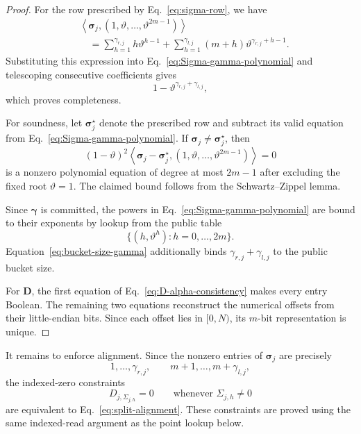 \begin{proof}
For the row prescribed by Eq.~\eqref{eq:sigma-row}, we have
\[
\begin{aligned}
&
\left\langle
\bm\sigma_j,
(1,\vartheta,\ldots,\vartheta^{2m-1})
\right\rangle\\
&\quad=
\sum_{h=1}^{\gamma_{r,j}}
    h\vartheta^{h-1}
+
\sum_{h=1}^{\gamma_{l,j}}
    (m+h)\vartheta^{\gamma_{r,j}+h-1}.
\end{aligned}
\]
Substituting this expression into
Eq.~\eqref{eq:Sigma-gamma-polynomial} and telescoping consecutive
coefficients gives
\[
    1-\vartheta^{\gamma_{r,j}+\gamma_{l,j}},
\]
which proves completeness.

For soundness, let $\bm\sigma_j^\star$ denote the prescribed row and
subtract its valid equation from
Eq.~\eqref{eq:Sigma-gamma-polynomial}.  If
$\bm\sigma_j\neq\bm\sigma_j^\star$, then
\[
(1-\vartheta)^2
\left\langle
\bm\sigma_j-\bm\sigma_j^\star,
(1,\vartheta,\ldots,\vartheta^{2m-1})
\right\rangle
=0
\]
is a nonzero polynomial equation of degree at most $2m-1$ after excluding
the fixed root $\vartheta=1$.  The claimed bound follows from the
Schwartz--Zippel lemma.

Since $\bm\gamma$ is committed, the powers in
Eq.~\eqref{eq:Sigma-gamma-polynomial} are bound to their exponents by
lookup from the public table
\[
    \{(h,\vartheta^h):h=0,\ldots,2m\}.
\]
Equation~\eqref{eq:bucket-size-gamma} additionally binds
$\gamma_{r,j}+\gamma_{l,j}$ to the public bucket size.

For $\bm D$, the first equation of
Eq.~\eqref{eq:D-alpha-consistency} makes every entry Boolean.  The
remaining two equations reconstruct the numerical offsets from their
little-endian bits.  Since each offset lies in $[0,N)$, its $m$-bit
representation is unique.
\end{proof}

It remains to enforce alignment.  Since the nonzero entries of
$\bm\sigma_j$ are precisely
\[
    1,\ldots,\gamma_{r,j},
    \qquad
    m+1,\ldots,m+\gamma_{l,j},
\]
the indexed-zero constraints
\begin{equation}
\label{eq:alignment-indexed-zero}
    D_{j,\Sigma_{j,h}}=0
    \qquad
    \text{whenever }\Sigma_{j,h}\neq0
\end{equation}
are equivalent to Eq.~\eqref{eq:split-alignment}.  These constraints are
proved using the same indexed-read argument as the point lookup below.

